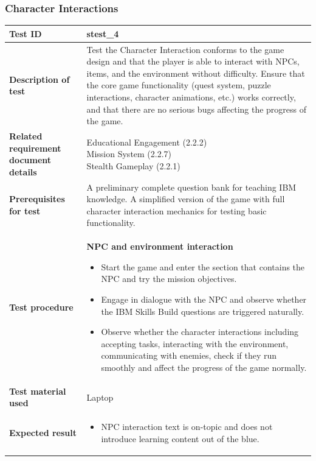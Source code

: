 \documentclass[11pt, a4paper]{article}
\begin{document}
\newpage

\subsubsection{Character Interactions}

\begin{center}
\begin{tabularx}{\linewidth}{|>{\raggedright\arraybackslash}m{4cm}|X|}
    \hline
    \textbf{Test ID} & stest\_4 \\
    \hline
    \textbf{Description of test} & Test the Character Interaction conforms to the game design and that the player is able to interact with NPCs, items, and the environment without difficulty.
    Ensure that the core game functionality (quest system, puzzle interactions, character animations, etc.) works correctly, and that there are no serious bugs affecting the progress of the game.\\
    \hline
    \textbf{Related requirement document details} & \makecell[l]{
        Educational Engagement (2.2.2) \\
        Mission System (2.2.7) \\
        Stealth Gameplay (2.2.1)
    } \\
    \hline
    \textbf{Prerequisites for test} & A preliminary complete question bank for teaching IBM knowledge. A simplified version of the game with full character interaction mechanics for testing basic functionality. \\
    \hline
    \textbf{Test procedure} &
     \textbf{NPC and environment interaction}
    \begin{itemize}
        \item Start the game and enter the section that contains the NPC and try the mission objectives.
        \item Engage in dialogue with the NPC and observe whether the IBM Skills Build questions are triggered naturally.
        \item Observe whether the character interactions including accepting tasks, interacting with the environment, communicating with enemies, check if they run smoothly and affect the progress of the game normally.
    \end{itemize}
    \\
    \hline
    \textbf{Test material used} & Laptop \\
    \hline
    \textbf{Expected result} &
    \begin{itemize}
        \item NPC interaction text is on-topic and does not introduce learning content out of the blue.

\end{itemize}
\end{tabularx}
\end{center}
\end{document}
